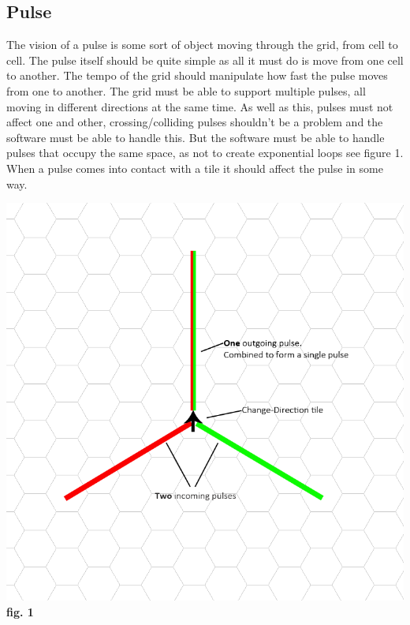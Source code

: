 \documentclass[10pt,a4paper]{article}
\begin{document}
\subsection{Pulse}
The vision of a pulse is some sort of object moving through the grid, from cell to cell. The pulse itself should be quite simple as all it must do is move from one cell to another. The tempo of the grid should manipulate how fast the pulse moves from one to another. The grid must be able to support multiple pulses, all moving in different directions at the same time. As well as this, pulses must not affect one and other, crossing/colliding pulses shouldn't be a problem and the software must be able to handle this. But the software must be able to handle pulses that occupy the same space, as not to create exponential loops see figure 1. When a pulse comes into contact with a tile it should affect the pulse in some way.
\begin{center}
\includegraphics[scale=0.4]{6.png}\\
\textbf{fig. 1}
\end{center}
\end{document}
